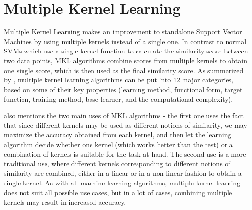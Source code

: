 \section{Multiple Kernel Learning}
Multiple Kernel Learning makes an improvement to standalone Support Vector Machines by using multiple kernels instead of a single one. In contrast to normal SVMs which use a single kernel function to calculate the similarity score between two data points, MKL algorithms combine scores from multiple kernels to obtain one single score, which is then used as the final similarity score. As summarized by \cite{gonen11a}, multiple kernel learning algorithms can be put into 12 major categories, based on some of their key properties (learning method, functional form, target function, training method, base learner, and the computational complexity).

\cite{gonen11a} also mentions the two main uses of MKL algorithms - the first one uses the fact that since different kernels may be used as different notions of similarity, we may maximize the accuracy obtained from each kernel, and then let the learning algorithm decide whether one kernel (which works better than the rest) or a combination of kernels is suitable for the task at hand. The second use is a more traditional use, where different kernels corresponding to different notions of similarity are combined, either in a linear or in a non-linear fashion to obtain a single kernel. As with all machine learning algorithms, multiple kernel learning does not suit all possible use cases, but in a lot of cases, combining multiple kernels may result in increased accuracy.
